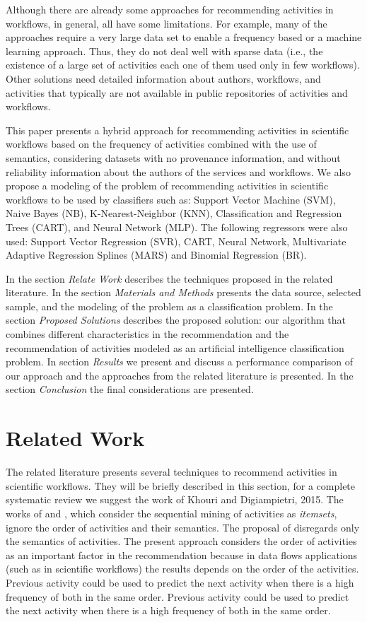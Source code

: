\documentclass{RITA}
\begin{document}
Although there are already some approaches for recommending activities in workflows, in general, all have some limitations. For example, many of the approaches require a very large data set to enable a frequency based or a machine learning approach. Thus, they do not deal well with sparse data (i.e., the existence of a large set of activities each one of them used only in few workflows). Other solutions need detailed information about authors, workflows, and activities that typically are not available in public repositories of activities and workflows.

This paper presents a hybrid approach for recommending activities in scientific workflows based on the frequency of activities combined with the use of semantics, considering datasets with no provenance information, and without reliability information about the authors of the services and workflows. We also propose a modeling of the problem of recommending activities in scientific workflows to be used by classifiers such as: Support Vector Machine (SVM), Naive Bayes (NB), K-Nearest-Neighbor (KNN), Classification and Regression Trees (CART), and Neural Network (MLP). The following regressors were also used: Support Vector Regression (SVR), CART, Neural Network, Multivariate Adaptive Regression Splines (MARS) and Binomial Regression (BR).

In the section \emph{Relate Work} describes the techniques proposed in the related literature. In the section \emph{Materials and Methods} presents the data source, selected sample, and the modeling of the problem as a classification problem. In the section \emph{Proposed Solutions} describes the proposed solution: our algorithm that combines different characteristics in the recommendation and the recommendation of activities modeled as an artificial intelligence classification problem. In section \emph{Results} we present and discuss a performance comparison of our approach and the approaches from the related literature is presented. In the section \emph{Conclusion} the final considerations are presented.

\section{Related Work}
The related literature presents several techniques to recommend activities in scientific workflows. They will be briefly described in this section, for a complete systematic review we suggest the work of Khouri and Digiampietri, 2015\nocite{Khouri2015}. The works of \cite{Shao2007} and \cite{Shao2009}, which consider the sequential mining of activities as \emph{itemsets}, ignore the order of activities and their semantics. The proposal of \cite{TostaBraganholo2015} disregards only the semantics of activities. The present approach considers the order of activities as an important factor in the recommendation because in data flows applications (such as in scientific workflows) the results depends on the order of the activities. Previous activity could be used to predict the next activity when there is a high frequency of both in the same order. Previous activity could be used to predict the next activity when there is a high frequency of both in the same order.
\end{document}
